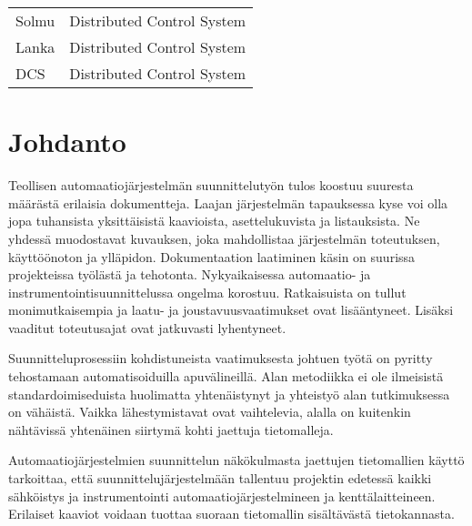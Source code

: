 \documentclass[finnish,12pt]{article}
\begin{document}
	\begin{tabular}{ll}
Solmu       & Distributed Control System \\
Lanka        & Distributed Control System \\
DCS        & Distributed Control System \\

	\end{tabular}

	\cleardoublepage
	\storeinipagenumber
	\setcounter{page}{1}


	\section{Johdanto}
	\thispagestyle{empty}

Teollisen automaatiojärjestelmän suunnittelutyön tulos koostuu suuresta määrästä erilaisia dokumentteja.
Laajan järjestelmän tapauksessa kyse voi olla jopa tuhansista yksittäisistä kaavioista, asettelukuvista ja listauksista.
Ne yhdessä muodostavat kuvauksen, joka mahdollistaa järjestelmän toteutuksen, käyttöönoton ja ylläpidon.
Dokumentaation laatiminen käsin on suurissa projekteissa työlästä ja tehotonta.
Nykyaikaisessa automaatio- ja instrumentointisuunnittelussa ongelma korostuu.
Ratkaisuista on tullut monimutkaisempia ja laatu- ja joustavuusvaatimukset ovat lisääntyneet.
Lisäksi vaaditut toteutusajat ovat jatkuvasti lyhentyneet.
\cite{RefWorks:41}

Suunnitteluprosessiin kohdistuneista vaatimuksesta johtuen työtä on pyritty tehostamaan automatisoiduilla apuvälineillä.
Alan metodiikka ei ole ilmeisistä standardoimiseduista huolimatta yhtenäistynyt ja yhteistyö alan tutkimuksessa on vähäistä.
Vaikka lähestymistavat ovat vaihtelevia, alalla on kuitenkin nähtävissä yhtenäinen siirtymä kohti jaettuja tietomalleja.

Automaatiojärjestelmien suunnittelun näkökulmasta jaettujen tietomallien käyttö tarkoittaa,
että suunnittelujärjestelmään tallentuu projektin edetessä kaikki sähköistys ja instrumentointi automaatiojärjestelmineen ja kenttälaitteineen.
Erilaiset kaaviot voidaan tuottaa suoraan tietomallin sisältävästä tietokannasta.
\end{document}
